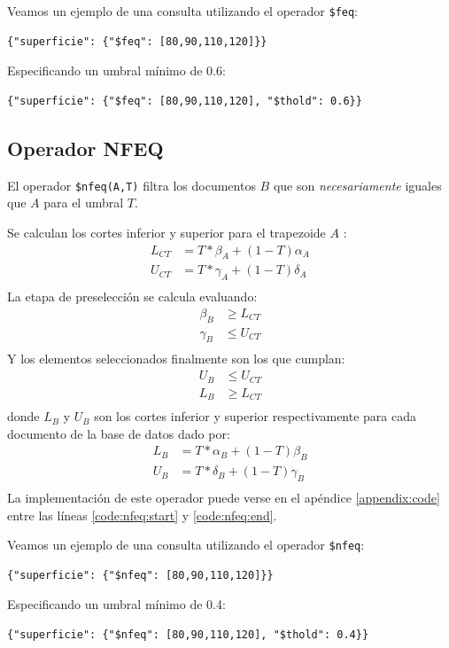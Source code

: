 \begin{example}
Veamos un ejemplo de una consulta utilizando el operador \texttt{\$feq}:
%
\begin{verbatim}
{"superficie": {"$feq": [80,90,110,120]}}
\end{verbatim}
%
Especificando un umbral mínimo de 0.6:
%
\begin{verbatim}
{"superficie": {"$feq": [80,90,110,120], "$thold": 0.6}}
\end{verbatim}

\end{example}

\subsection{Operador NFEQ}

El operador \texttt{\$nfeq(A,T)} filtra los documentos $B$ que son \textit{necesariamente} iguales que $A$ para el umbral $T$.

Se calculan los cortes inferior y superior para el trapezoide $A$ \cite{indexingneccesary}:
%
\begin{align*}
    L_{CT} &= T * \beta_A + (1-T)\alpha_A \\
    U_{CT} &= T * \gamma_A + (1-T)\delta_A \\
\end{align*}
%
La etapa de preselección se calcula evaluando:
%
\begin{align*}
    \beta_B &\geq L_{CT} \\
    \gamma_B &\leq U_{CT} \\
\end{align*}
%
Y los elementos seleccionados finalmente son los que cumplan:
%
\begin{align*}
    U_B &\leq U_{CT} \\
    L_B &\geq L_{CT} \\
\end{align*}
%
donde $L_B$ y $U_B$ son los cortes inferior y superior respectivamente para cada documento de la base de datos dado por:
%
\begin{align*}
    L_B &= T * \alpha_B + (1-T)\beta_B \\
    U_B &= T * \delta_B + (1-T)\gamma_B \\
\end{align*}
%
La implementación de este operador puede verse en el apéndice \ref{appendix:code} entre las líneas \ref{code:nfeq:start} y \ref{code:nfeq:end}.

\begin{example}
Veamos un ejemplo de una consulta utilizando el operador \texttt{\$nfeq}:
%
\begin{verbatim}
{"superficie": {"$nfeq": [80,90,110,120]}}
\end{verbatim}
%
Especificando un umbral mínimo de 0.4:
%
\begin{verbatim}
{"superficie": {"$nfeq": [80,90,110,120], "$thold": 0.4}}
\end{verbatim}

\end{example}

